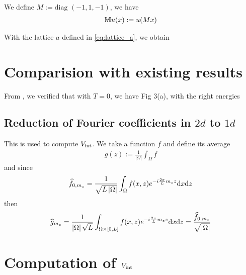 \documentclass[11pt,a4paper,reqno,french,tikz]{amsart}
\def\d{{\rm d}}
\newcommand{\pa}[1]{\left( #1 \right)} %
\newcommand{\ab}[1]{\left|#1\right|} %
\newcommand{\f}[2]{\frac{#1}{#2}} %
\newcommand{\ind}[1]{_{\textup{#1}}} %
\begin{document}
We define $M := \text{diag } \pa{-1,1,-1}$, we have
\begin{align*}
\mathbb{M} u(x) := u(M x)
\end{align*}

With the lattice $a$ defined in \eqref{eq:lattice_a}, we obtain

\section{Comparision with existing results}%
\label{sec:comparision_with_existing_results}

From \cite{FanCarZhu19}, we verified that with $T=0$, we have Fig 3(a), with the right energies

\subsection{Reduction of Fourier coefficients in $2d$ to $1d$}%
\label{sub:reduction_of_fourier_coefficients_in_2d_to_1d_}

This is used to compute $V\ind{int}$. We take a function $f$ and define its average
\begin{align*}
g(z) := \f{1}{\ab{\Omega}} \int_\Omega f
\end{align*}
and since
\begin{align*}
\widehat{f}_{0,m_z} = \f{1}{\sqrt{L \ab{\Omega}}} \int_\Omega f(x,z) e^{-i\f{2\pi}{L} m_z z} \d x \d z
\end{align*}
then
\begin{align*}
\widehat{g}_{m_z} = \f{1}{\ab{\Omega} \sqrt{L}} \int_{\Omega \times [0,L]} f(x,z) e^{-i\f{2\pi}{L} m_z z} \d x \d z = \f{\widehat{f}_{0,m_z}}{\sqrt{\ab{\Omega}}}
\end{align*}



\section{Computation of $V\ind{int}$}%
\label{sec:computation_of_vint_}
\end{document}
